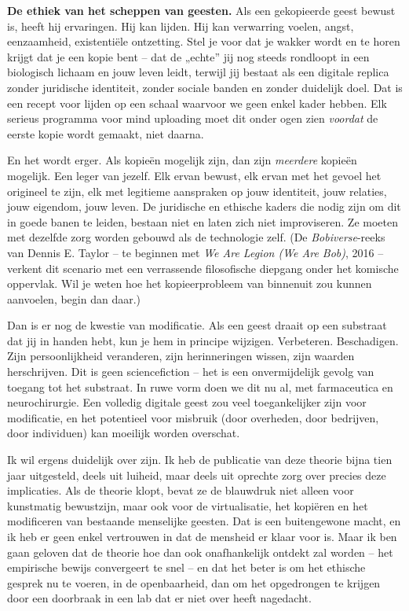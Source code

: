 \documentclass[11pt, twoside, openright]{book}
\begin{document}
\textbf{De ethiek van het scheppen van geesten.} Als een gekopieerde geest bewust is, heeft hij ervaringen. Hij kan lijden. Hij kan verwarring voelen, angst, eenzaamheid, existentiële ontzetting. Stel je voor dat je wakker wordt en te horen krijgt dat je een kopie bent -- dat de „echte” jij nog steeds rondloopt in een biologisch lichaam en jouw leven leidt, terwijl jij bestaat als een digitale replica zonder juridische identiteit, zonder sociale banden en zonder duidelijk doel. Dat is een recept voor lijden op een schaal waarvoor we geen enkel kader hebben. Elk serieus programma voor mind uploading moet dit onder ogen zien \textit{voordat} de eerste kopie wordt gemaakt, niet daarna.

En het wordt erger. Als kopieën mogelijk zijn, dan zijn \textit{meerdere} kopieën mogelijk. Een leger van jezelf. Elk ervan bewust, elk ervan met het gevoel het origineel te zijn, elk met legitieme aanspraken op jouw identiteit, jouw relaties, jouw eigendom, jouw leven. De juridische en ethische kaders die nodig zijn om dit in goede banen te leiden, bestaan niet en laten zich niet improviseren. Ze moeten met dezelfde zorg worden gebouwd als de technologie zelf. (De \textit{Bobiverse}-reeks van Dennis E. Taylor -- te beginnen met \textit{We Are Legion (We Are Bob)}, 2016 -- verkent dit scenario met een verrassende filosofische diepgang onder het komische oppervlak. Wil je weten hoe het kopieerprobleem van binnenuit zou kunnen aanvoelen, begin dan daar.)

Dan is er nog de kwestie van modificatie. Als een geest draait op een substraat dat jij in handen hebt, kun je hem in principe wijzigen. Verbeteren. Beschadigen. Zijn persoonlijkheid veranderen, zijn herinneringen wissen, zijn waarden herschrijven. Dit is geen sciencefiction -- het is een onvermijdelijk gevolg van toegang tot het substraat. In ruwe vorm doen we dit nu al, met farmaceutica en neurochirurgie. Een volledig digitale geest zou veel toegankelijker zijn voor modificatie, en het potentieel voor misbruik (door overheden, door bedrijven, door individuen) kan moeilijk worden overschat.

Ik wil ergens duidelijk over zijn. Ik heb de publicatie van deze theorie bijna tien jaar uitgesteld, deels uit luiheid, maar deels uit oprechte zorg over precies deze implicaties. Als de theorie klopt, bevat ze de blauwdruk niet alleen voor kunstmatig bewustzijn, maar ook voor de virtualisatie, het kopiëren en het modificeren van bestaande menselijke geesten. Dat is een buitengewone macht, en ik heb er geen enkel vertrouwen in dat de mensheid er klaar voor is. Maar ik ben gaan geloven dat de theorie hoe dan ook onafhankelijk ontdekt zal worden -- het empirische bewijs convergeert te snel -- en dat het beter is om het ethische gesprek nu te voeren, in de openbaarheid, dan om het opgedrongen te krijgen door een doorbraak in een lab dat er niet over heeft nagedacht.
\end{document}
